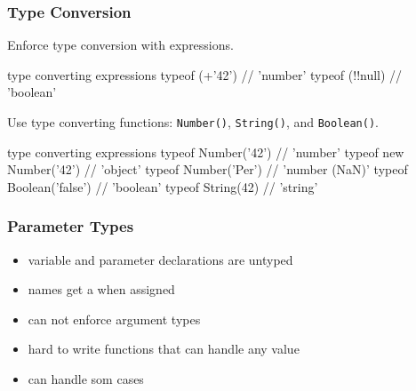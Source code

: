 \begin{frame}[fragile]
  \frametitle{Type Conversion}
  Enforce type conversion with expressions.\\
  \begin{CodeBox}{ type converting expressions}
typeof (+'42') // 'number'
typeof (!!null) // 'boolean'
  \end{CodeBox}
  \vspace{5mm}
  Use type converting functions: \verb|Number()|, \verb|String()|, and \verb|Boolean()|.
  \begin{CodeBox}{ type converting expressions}
typeof Number('42') // 'number'
typeof new Number('42') // 'object'
typeof Number('Per') // 'number (NaN)'
typeof Boolean('false') // 'boolean'
typeof String(42) // 'string'
  \end{CodeBox}
\end{frame}

\begin{frame}[fragile]
  \frametitle{Parameter Types}
  \begin{itemize}
  \item variable and parameter declarations are untyped
  \item names get a  when assigned
  \item can not enforce argument types
  \item hard to write functions that can handle any value
  \item {} can handle som cases
  \end{itemize}
\end{frame}

